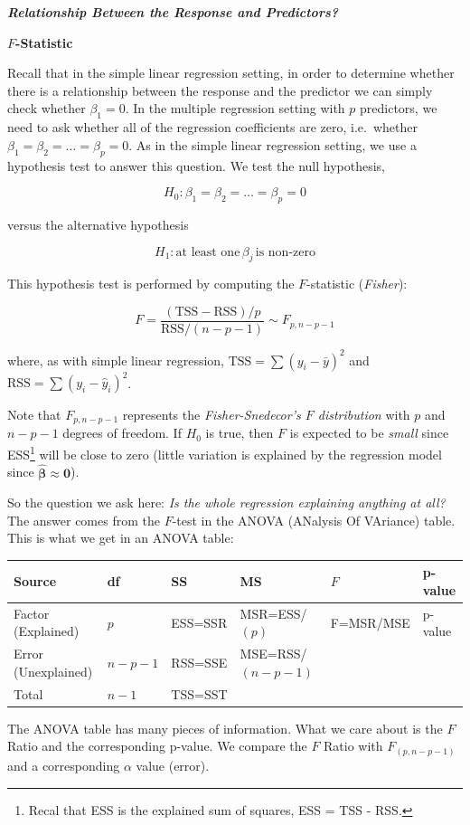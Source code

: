 \documentclass[]{book}
\let\rmarkdownfootnote\footnote%
\def\footnote{\protect\rmarkdownfootnote}
\theoremstyle{definition}
\theoremstyle{definition}
\theoremstyle{definition}
\theoremstyle{remark}
\begin{document}
\textbf{\emph{Relationship Between the Response and Predictors?}}

\textbf{\(F\)-Statistic}

Recall that in the simple linear regression setting, in order to
determine whether there is a relationship between the response and the
predictor we can simply check whether \(\beta_1 = 0\). In the multiple
regression setting with \(p\) predictors, we need to ask whether all of
the regression coefficients are zero, i.e.~whether
\(\beta_1 = \beta_2 = \ldots = \beta_p = 0\). As in the simple linear
regression setting, we use a hypothesis test to answer this question. We
test the null hypothesis,

\[ H_0 : \beta_1 = \beta_2 = \ldots = \beta_p = 0 \]

versus the alternative hypothesis

\[ H_1 : \text{at least one} \, \beta_j \, \text{is non-zero} \]

This hypothesis test is performed by computing the \(F\)-statistic
(\emph{Fisher}):

\[ F = \frac{ (\text{TSS} - \text{RSS})/p}{\text{RSS}/(n-p-1)} \sim F_{p,n-p-1} \]

where, as with simple linear regression,
\(\text{TSS} = \sum (y_i - \bar{y})^2\) and
\(\text{RSS} = \sum (y_i - \hat{y}_i)^2\).

Note that \(F_{p,n-p-1}\) represents the \emph{Fisher-Snedecor's \(F\)
distribution} with \(p\) and \(n-p-1\) degrees of freedom. If \(H_0\) is
true, then \(F\) is expected to be \emph{small} since ESS\footnote{Recal
  that ESS is the explained sum of squares, ESS = TSS - RSS.} will be
close to zero (little variation is explained by the regression model
since \(\hat{\boldsymbol{\beta}}\approx\mathbf{0}\)).

So the question we ask here: \emph{Is the whole regression explaining
anything at all?} The answer comes from the \(F\)-test in the ANOVA
(ANalysis Of VAriance) table. This is what we get in an ANOVA table:

\begin{longtable}[]{@{}llllll@{}}
\toprule
Source & df & SS & MS & \(F\) & p-value\tabularnewline
\midrule
\endhead
Factor (Explained) & \(p\) & ESS=SSR & MSR=ESS/\((p)\) & F=MSR/MSE &
p-value\tabularnewline
Error (Unexplained) & \(n-p-1\) & RSS=SSE & MSE=RSS/\((n-p-1)\) &
&\tabularnewline
Total & \(n-1\) & TSS=SST & & &\tabularnewline
\bottomrule
\end{longtable}

The ANOVA table has many pieces of information. What we care about is
the \(F\) Ratio and the corresponding p-value. We compare the \(F\)
Ratio with \(F_{(p,n-p-1)}\) and a corresponding \(\alpha\) value
(error).
\end{document}
